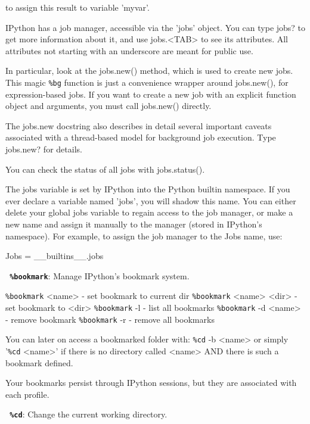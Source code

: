         to assign this result to variable 'myvar'.

        IPython has a job manager, accessible via the 'jobs' object.  You can
        type jobs? to get more information about it, and use jobs.<TAB> to see
        its attributes.  All attributes not starting with an underscore are
        meant for public use.

        In particular, look at the jobs.new() method, which is used to create
        new jobs.  This magic \texttt{\%bg} function is just a convenience wrapper
        around jobs.new(), for expression-based jobs.  If you want to create a
        new job with an explicit function object and arguments, you must call
        jobs.new() directly.

        The jobs.new docstring also describes in detail several important
        caveats associated with a thread-based model for background job
        execution.  Type jobs.new? for details.

        You can check the status of all jobs with jobs.status().

        The jobs variable is set by IPython into the Python builtin namespace.
        If you ever declare a variable named 'jobs', you will shadow this
        name.  You can either delete your global jobs variable to regain
        access to the job manager, or make a new name and assign it manually
        to the manager (stored in IPython's namespace).  For example, to
        assign the job manager to the Jobs name, use:

          Jobs = \_\_builtins\_\_.jobs

\bigskip
\texttt{\textbf{ \%bookmark}}:
	Manage IPython's bookmark system.

        \texttt{\%bookmark} <name>       - set bookmark to current dir
        \texttt{\%bookmark} <name> <dir> - set bookmark to <dir>
        \texttt{\%bookmark} -l           - list all bookmarks
        \texttt{\%bookmark} -d <name>    - remove bookmark
        \texttt{\%bookmark} -r           - remove all bookmarks

        You can later on access a bookmarked folder with:
          \texttt{\%cd} -b <name>
        or simply '\texttt{\%cd} <name>' if there is no directory called <name> AND
        there is such a bookmark defined.

        Your bookmarks persist through IPython sessions, but they are
        associated with each profile.

\bigskip
\texttt{\textbf{ \%cd}}:
	Change the current working directory.

